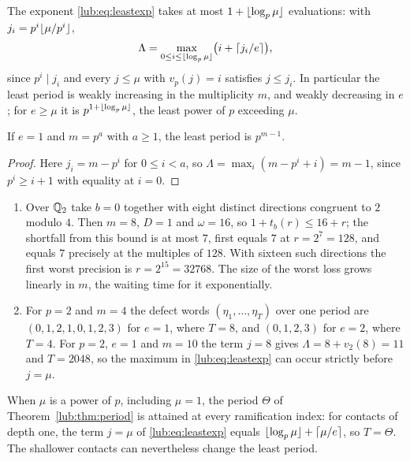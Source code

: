 The exponent \eqref{lub:eq:leastexp} takes at most $1+\lfloor\log_p\mu\rfloor$ evaluations: with
$j_i=p^i\lfloor\mu/p^i\rfloor$,
\[
 \Lambda=\max_{0\le i\le\lfloor\log_p\mu\rfloor}\bigl(i+\lceil j_i/e\rceil\bigr),
\]
since $p^i\mid j_i$ and every $j\le\mu$ with $v_p(j)=i$ satisfies $j\le j_i$. In particular
the least period is weakly increasing in the multiplicity $m$, and weakly decreasing in $e$;
for $e\ge\mu$ it is $p^{1+\lfloor\log_p\mu\rfloor}$, the least power of $p$ exceeding $\mu$.

\begin{corollary}\label{lub:cor:power}
If $e=1$ and $m=p^a$ with $a\ge1$, the least period is $p^{m-1}$.
\end{corollary}

\begin{proof}
Here $j_i=m-p^i$ for $0\le i<a$, so $\Lambda=\max_i(m-p^i+i)=m-1$, since $p^i\ge i+1$ with
equality at $i=0$.
\end{proof}

\begin{example}\label{lub:ex:period}
\begin{enumerate}[label=\textup{(\arabic*)}]
\item Over $\mathbb{Q}_2$ take $b=0$ together with eight distinct directions congruent to $2$ modulo
$4$. Then $m=8$, $D=1$ and $\omega=16$, so $1+t_b(r)\le16+r$; the shortfall from this bound is
at most $7$, first equals $7$ at $r=2^7=128$, and equals $7$ precisely at the multiples of
$128$. With sixteen such directions the first worst precision is $r=2^{15}=32768$. The size
of the worst loss grows linearly in $m$, the waiting time for it exponentially.
\item For $p=2$ and $m=4$ the defect words $(\eta_1,\dots,\eta_T)$ over one period are
$(0,1,2,1,0,1,2,3)$ for $e=1$, where $T=8$, and $(0,1,2,3)$ for $e=2$, where $T=4$. For
$p=2$, $e=1$ and $m=10$ the term $j=8$ gives $\Lambda=8+v_2(8)=11$ and $T=2048$, so the
maximum in \eqref{lub:eq:leastexp} can occur strictly before $j=\mu$.
\end{enumerate}
\end{example}

When $\mu$ is a power of $p$, including $\mu=1$, the period $\Theta$ of
Theorem~\ref{lub:thm:period} is attained at every ramification index: for contacts of depth
one, the term $j=\mu$ of \eqref{lub:eq:leastexp} equals $\lfloor\log_p\mu\rfloor+\lceil\mu/e\rceil$, so
$T=\Theta$. The shallower contacts can nevertheless change the least period.

